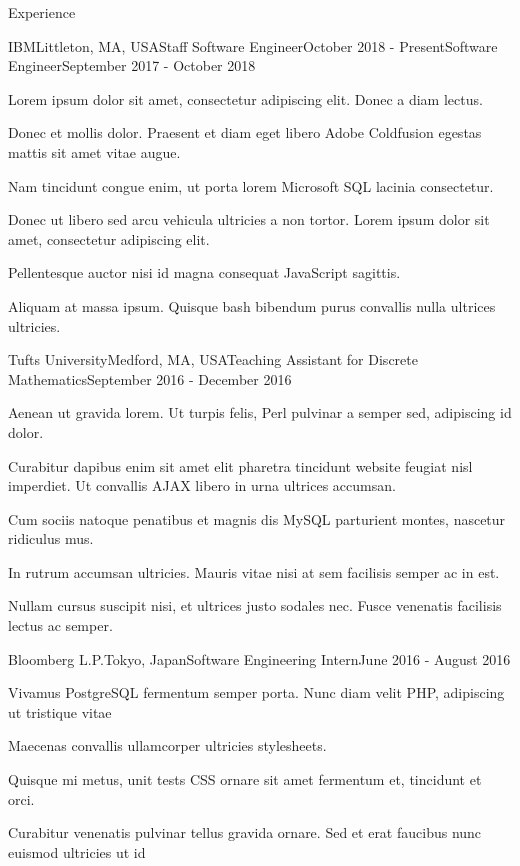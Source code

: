 \documentclass{resume}
\begin{document}
  \begin{rSection}{Experience}
    \begin{rSubsection}{IBM}{Littleton, MA, USA}{Staff Software Engineer}{October 2018 - Present}{Software Engineer}{September 2017 - October 2018}
    \item Lorem ipsum dolor sit amet, consectetur adipiscing elit. Donec a diam lectus.
    \item Donec et mollis dolor. Praesent et diam eget libero Adobe Coldfusion egestas mattis sit amet vitae augue.
    \item Nam tincidunt congue enim, ut porta lorem Microsoft SQL lacinia consectetur.
    \item Donec ut libero sed arcu vehicula ultricies a non tortor. Lorem ipsum dolor sit amet, consectetur adipiscing elit.
    \item Pellentesque auctor nisi id magna consequat JavaScript sagittis.
    \item Aliquam at massa ipsum. Quisque bash bibendum purus convallis nulla ultrices ultricies.
    \end{rSubsection}
    
    \begin{rSubsection}{Tufts University}{Medford, MA, USA}{Teaching Assistant for Discrete Mathematics}{September 2016 - December 2016}{}{}
    \item Aenean ut gravida lorem. Ut turpis felis, Perl pulvinar a semper sed, adipiscing id dolor.
    \item Curabitur dapibus enim sit amet elit pharetra tincidunt website feugiat nisl imperdiet. Ut convallis AJAX libero in urna ultrices accumsan.
    \item Cum sociis natoque penatibus et magnis dis MySQL parturient montes, nascetur ridiculus mus.
    \item In rutrum accumsan ultricies. Mauris vitae nisi at sem facilisis semper ac in est.
    \item Nullam cursus suscipit nisi, et ultrices justo sodales nec. Fusce venenatis facilisis lectus ac semper.
    \end{rSubsection}
    
    \begin{rSubsection}{Bloomberg L.P.}{Tokyo, Japan}{Software Engineering Intern}{June 2016 - August 2016}{}{}
    \item Vivamus PostgreSQL fermentum semper porta. Nunc diam velit PHP, adipiscing ut tristique vitae
    \item Maecenas convallis ullamcorper ultricies stylesheets.
    \item Quisque mi metus, unit tests CSS ornare sit amet fermentum et, tincidunt et orci.
    \item Curabitur venenatis pulvinar tellus gravida ornare. Sed et erat faucibus nunc euismod ultricies ut id
    \end{rSubsection}
  
  \end{rSection}
\end{document}
